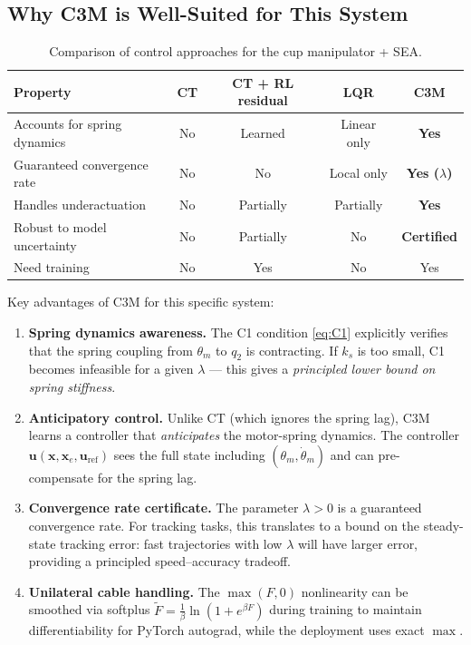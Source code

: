 \documentclass[11pt, a4paper]{article}
\newcommand{\bu}{\bm{u}}
\newcommand{\bx}{\bm{x}}
\begin{document}
\subsection{Why C3M is Well-Suited for This System}

\begin{table}[h]
\centering
\caption{Comparison of control approaches for the cup manipulator + SEA.}
\label{tab:comparison}
\begin{tabular}{@{}lcccc@{}}
\toprule
Property & CT & CT + RL residual & LQR & \textbf{C3M} \\
\midrule
Accounts for spring dynamics & No & Learned & Linear only & \textbf{Yes} \\
Guaranteed convergence rate  & No & No & Local only & \textbf{Yes ($\lambda$)} \\
Handles underactuation       & No & Partially & Partially & \textbf{Yes} \\
Robust to model uncertainty  & No & Partially & No & \textbf{Certified} \\
Need training                & No & Yes & No & Yes \\
\bottomrule
\end{tabular}
\end{table}

\noindent
Key advantages of C3M for this specific system:

\begin{enumerate}
\item \textbf{Spring dynamics awareness.}
      The C1 condition \eqref{eq:C1} explicitly verifies that the spring
      coupling from $\theta_m$ to $q_2$ is contracting.  If $k_s$ is too
      small, C1 becomes infeasible for a given $\lambda$ --- this gives a
      \emph{principled lower bound on spring stiffness}.

\item \textbf{Anticipatory control.}
      Unlike CT (which ignores the spring lag), C3M learns a controller
      that \emph{anticipates} the motor-spring dynamics.  The controller
      $\bu(\bx, \bx_e, \bu_\text{ref})$ sees the full state including
      $(\theta_m, \dot{\theta}_m)$ and can pre-compensate for the spring lag.

\item \textbf{Convergence rate certificate.}
      The parameter $\lambda > 0$ is a guaranteed convergence rate.
      For tracking tasks, this translates to a bound on the steady-state
      tracking error: fast trajectories with low $\lambda$ will have larger
      error, providing a principled speed--accuracy tradeoff.

\item \textbf{Unilateral cable handling.}
      The $\max(F, 0)$ nonlinearity can be smoothed via softplus
      $\tilde{F} = \frac{1}{\beta}\ln(1 + e^{\beta F})$ during training
      to maintain differentiability for PyTorch autograd, while the
      deployment uses exact $\max$.
\end{enumerate}
\end{document}
